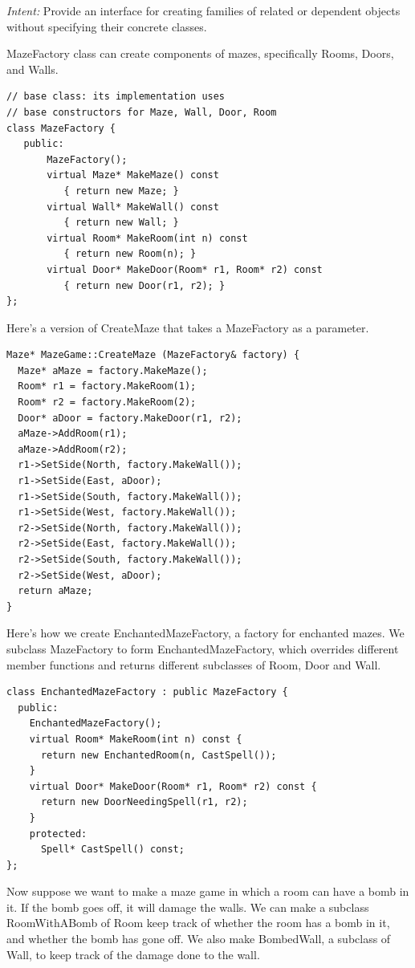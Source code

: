 \documentclass[11pt]{report}
\begin{document}
\noindent
{\em Intent:} Provide an interface for creating families of related or dependent objects without specifying 
their concrete classes.

MazeFactory class can create components of mazes, specifically Rooms, Doors, and Walls. 
\begin{lstlisting}
// base class: its implementation uses       
// base constructors for Maze, Wall, Door, Room
class MazeFactory {
   public:
       MazeFactory();
       virtual Maze* MakeMaze() const
          { return new Maze; }
       virtual Wall* MakeWall() const
          { return new Wall; }
       virtual Room* MakeRoom(int n) const
          { return new Room(n); }
       virtual Door* MakeDoor(Room* r1, Room* r2) const
          { return new Door(r1, r2); }
};
\end{lstlisting}

Here's a version of CreateMaze that takes a MazeFactory as a parameter.
\begin{lstlisting}
Maze* MazeGame::CreateMaze (MazeFactory& factory) {
  Maze* aMaze = factory.MakeMaze();
  Room* r1 = factory.MakeRoom(1);
  Room* r2 = factory.MakeRoom(2);
  Door* aDoor = factory.MakeDoor(r1, r2);
  aMaze->AddRoom(r1);
  aMaze->AddRoom(r2);
  r1->SetSide(North, factory.MakeWall());
  r1->SetSide(East, aDoor);
  r1->SetSide(South, factory.MakeWall());
  r1->SetSide(West, factory.MakeWall());
  r2->SetSide(North, factory.MakeWall());
  r2->SetSide(East, factory.MakeWall());
  r2->SetSide(South, factory.MakeWall());
  r2->SetSide(West, aDoor);
  return aMaze;
}
\end{lstlisting}


Here's how we create EnchantedMazeFactory, a factory for enchanted mazes.
We subclass MazeFactory to form EnchantedMazeFactory, which overrides different
member functions and returns different subclasses of Room, Door and Wall.
\begin{lstlisting}
class EnchantedMazeFactory : public MazeFactory {
  public:
    EnchantedMazeFactory();
    virtual Room* MakeRoom(int n) const { 
      return new EnchantedRoom(n, CastSpell()); 
    }
    virtual Door* MakeDoor(Room* r1, Room* r2) const { 
      return new DoorNeedingSpell(r1, r2); 
    }
    protected:
      Spell* CastSpell() const;
};
\end{lstlisting}


Now suppose we want to make a maze game in which a room can have a bomb in it. If the 
bomb goes off, it will damage the walls. We can make a subclass RoomWithABomb of Room keep track of whether
the room has a bomb in it, and whether the bomb has gone off. We also make BombedWall, a subclass of
Wall, to keep track of the damage done to the wall. 
\end{document}
